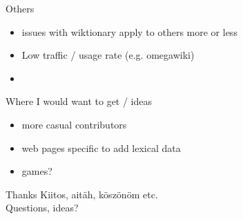 \documentclass{beamer}
\begin{document}
\begin{frame}{Others}
    \begin{itemize}
        \item issues with wiktionary apply to others more or less
        \item Low traffic / usage rate (e.g. omegawiki)
        \item 
    \end{itemize}
\end{frame}

\begin{frame}{Where I would want to get / ideas}
    \begin{itemize}
        \item more casual contributors
        \item web pages specific to add lexical data
        \item games?
    \end{itemize}
\end{frame}

\begin{frame}{Thanks}
    Kiitos, aitäh, köszönöm etc.\\
    Questions, ideas?
\end{frame}
\end{document}
